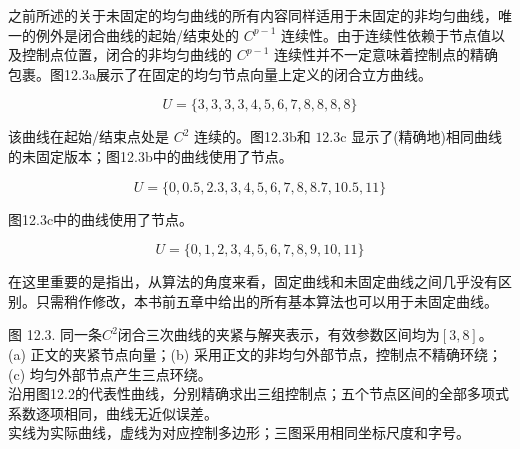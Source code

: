 \documentclass[../main.tex]{subfiles}
\begin{document}
之前所述的关于未固定的均匀曲线的所有内容同样适用于未固定的非均匀曲线，唯一的例外是闭合曲线的起始/结束处的 \({C}^{p - 1}\) 连续性。由于连续性依赖于节点值以及控制点位置，闭合的非均匀曲线的 \({C}^{p - 1}\) 连续性并不一定意味着控制点的精确包裹。图12.3a展示了在固定的均匀节点向量上定义的闭合立方曲线。

\[
U = \{ 3,3,3,3,4,5,6,7,8,8,8,8\}
\]

该曲线在起始/结束点处是 \({C}^{2}\) 连续的。图12.3b和 \({12.3}\mathrm{c}\) 显示了(精确地)相同曲线的未固定版本；图12.3b中的曲线使用了节点。

\[
U = \{ 0,{0.5},{2.3},3,4,5,6,7,8,{8.7},{10.5},{11}\}
\]

图12.3c中的曲线使用了节点。

\[
U = \{ 0,1,2,3,4,5,6,7,8,9,{10},{11}\}
\]

在这里重要的是指出，从算法的角度来看，固定曲线和未固定曲线之间几乎没有区别。只需稍作修改，本书前五章中给出的所有基本算法也可以用于未固定曲线。

\begin{center}
\begin{minipage}{37cm}
\centering
\begin{minipage}{17cm}\centering
{}
\end{minipage}\hspace{1cm}
\begin{minipage}{17cm}\centering
{}
\end{minipage}
\par\medskip
\begin{minipage}{17cm}\centering
{}
\end{minipage}
\par\smallskip
图 12.3. 同一条$C^2$闭合三次曲线的夹紧与解夹表示，有效参数区间均为$[3,8]$。\\
(a) 正文的夹紧节点向量；(b) 采用正文的非均匀外部节点，控制点不精确环绕；(c) 均匀外部节点产生三点环绕。\\
沿用图12.2的代表性曲线，分别精确求出三组控制点；五个节点区间的全部多项式系数逐项相同，曲线无近似误差。\\
实线为实际曲线，虚线为对应控制多边形；三图采用相同坐标尺度和字号。
\end{minipage}
\end{center}
\end{document}
